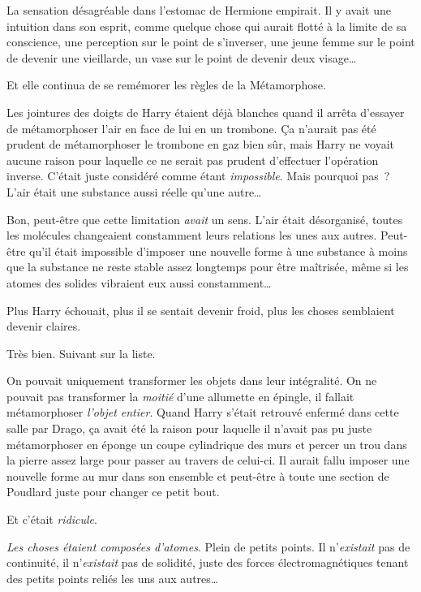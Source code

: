 La sensation désagréable dans l'estomac de Hermione empirait. Il y avait une intuition dans son esprit, comme quelque chose qui aurait flotté à la limite de sa conscience, une perception sur le point de s'inverser, une jeune femme sur le point de devenir une vieillarde, un vase sur le point de devenir deux visage…

Et elle continua de se remémorer les règles de la Métamorphose.

\later

Les jointures des doigts de Harry étaient déjà blanches quand il arrêta d'essayer de métamorphoser l'air en face de lui en un trombone. Ça n'aurait pas été prudent de métamorphoser le trombone en gaz bien sûr, mais Harry ne voyait aucune raison pour laquelle ce ne serait pas prudent d'effectuer l'opération inverse. C'était juste considéré comme étant \emph{impossible}. Mais pourquoi pas~? L'air était une substance aussi réelle qu'une autre…

Bon, peut-être que cette limitation \emph{avait} un sens. L'air était désorganisé, toutes les molécules changeaient constamment leurs relations les unes aux autres. Peut-être qu'il était impossible d'imposer une nouvelle forme à une substance à moins que la substance ne reste stable assez longtemps pour être maîtrisée, même si les atomes des solides vibraient eux aussi constamment…

Plus Harry échouait, plus il se sentait devenir froid, plus les choses semblaient devenir claires.

Très bien. Suivant sur la liste.

On pouvait uniquement transformer les objets dans leur intégralité. On ne pouvait pas transformer la \emph{moitié} d'une allumette en épingle, il fallait métamorphoser \emph{l'objet entier}. Quand Harry s'était retrouvé enfermé dans cette salle par Drago, ça avait été la raison pour laquelle il n'avait pas pu juste métamorphoser en éponge un coupe cylindrique des murs et percer un trou dans la pierre assez large pour passer au travers de celui-ci. Il aurait fallu imposer une nouvelle forme au mur dans son ensemble et peut-être à toute une section de Poudlard juste pour changer ce petit bout.

Et c'était \emph{ridicule}.

\emph{Les choses étaient composées d'atomes}. Plein de petits points. Il n'\emph{existait} pas de continuité, il n'\emph{existait} pas de solidité, juste des forces électromagnétiques tenant des petits points reliés les uns aux autres…

